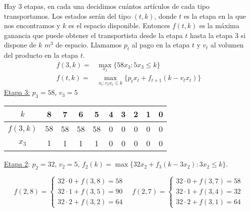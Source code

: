 \documentclass[twoside]{article}
\begin{document}
\newpage 
\begin{ejercicio}{2}



\begin{solucion}
Hay $3$ etapas, en cada una decidimos cuántos artículos de cada tipo transportamos. Los estados serán del tipo $(t,k)$, donde $t$ es la etapa en la que nos encontramos y $k$ es el espacio disponible. Entonces $f(t,k)$ es la máxima ganancia que puede obtener el transportista desde la etapa $t$ hasta la etapa $3$ si dispone de $k$ $m^3$ de espacio. Llamamos $p_t$ al pago en la etapa $t$ y $v_t$ al volumen del producto en la etapa $t$. 
\begin{align*}
f(3,k)=&\max_{x_3}\{58x_3: 5x_3\leq k\}\\
f(t,k)=&\max_{x_t:v_tx_t\leq k}\{p_tx_t+f_{t+1}(k-v_tx_t)\}
\end{align*}
\underline{Etapa 3:} $p_3=58$, $v_3=5$\
\begin{center}
\begin{tabular}{c| c c c c c c c c c}
$k$ & 8 & 7 & 6 & 5 & 4 & 3 & 2 & 1 & 0\\
\hline
$f(3,k)$ & $58$ & 58 & 58 & 58 & 0 & 0 & 0 & 0 & 0\\
$x_3$ &  $1$ & 1 & 1 & 1& 0 & 0 & 0 & 0 & 0
\end{tabular}
\end{center}
\underline{Etapa 2}: $p_2=32$, $v_2=5$, $f_2(k)=\max\{32x_2+f_3(k-3x_2):3x_2\leq k\}$.

$$f(2,8)=\begin{cases}
32\cdot 0+f(3,8)=58\\
32\cdot 1+f(3,5)=90\\
32\cdot 2+f(3,2)=64
\end{cases}\quad f(2,7)=\begin{cases}
32\cdot 0+f(3,7)=58\\
32\cdot 1+f(3,4)=32\\
32\cdot 2+f(3,1)=64
\end{cases}$$


\end{solucion}
\end{ejercicio}
\end{document}
